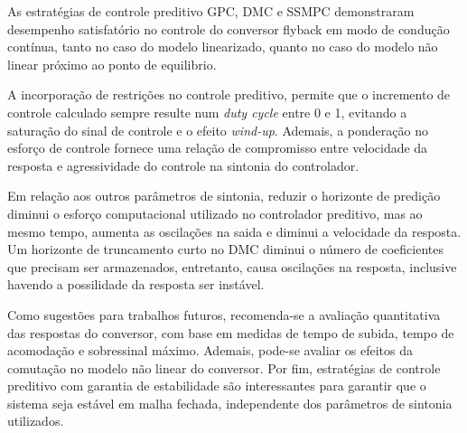 \documentclass{article}
\begin{document}
As estratégias de controle preditivo GPC, DMC e SSMPC demonstraram desempenho satisfatório no controle do conversor flyback em modo de condução contínua, tanto no caso do modelo linearizado, quanto no caso do modelo não linear próximo ao ponto de equilibrio.

A incorporação de restrições no controle preditivo, permite que o incremento de controle calculado sempre resulte num \textit{duty cycle} entre 0 e 1, evitando a saturação do sinal de controle e o efeito \textit{wind-up}. Ademais, a ponderação no esforço de controle fornece uma relação de compromisso entre velocidade da resposta e agressividade do controle na sintonia do controlador.

Em relação aos outros parâmetros de sintonia, reduzir o horizonte de predição diminui o esforço computacional utilizado no controlador preditivo, mas ao mesmo tempo, aumenta as oscilações na saida e diminui a velocidade da resposta. Um horizonte de truncamento curto no DMC diminui o número de coeficientes que precisam ser armazenados, entretanto, causa oscilações na resposta, inclusive havendo a possilidade da resposta ser instável.

Como sugestões para trabalhos futuros, recomenda-se a avaliação quantitativa das respostas do conversor, com base em medidas de tempo de subida, tempo de acomodação e sobressinal máximo.
Ademais, pode-se avaliar os efeitos da comutação no modelo não linear do conversor.
Por fim, estratégias de controle preditivo com garantia de estabilidade são interessantes para garantir que o sistema seja estável em malha fechada, independente dos parâmetros de sintonia utilizados.



\end{document}
